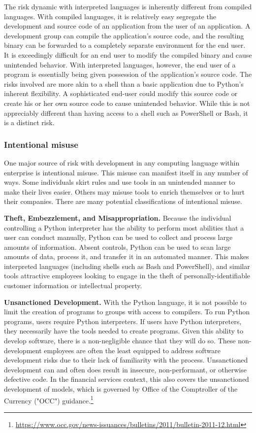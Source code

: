         The risk dynamic with interpreted languages is inherently different from compiled languages. With compiled languages, it is relatively easy segregate the development and source code of an application from the user of an application. A development group can compile the application's source code, and the resulting binary can be forwarded to a completely separate environment for the end user. It is exceedingly difficult for an end user to modify the compiled binary and cause unintended behavior. With interpreted languages, however, the end user of a program is essentially being given possession of the application's source code. The risks involved are more akin to a shell than a basic application due to Python's inherent flexibility. A sophisticated end-user could modify this source code or create his or her own source code to cause unintended behavior. While this is not appreciably different than having access to a shell such as PowerShell or Bash, it is a distinct risk.
 
        \subsubsection{Intentional misuse}
 
            One major source of risk with development in any computing language within enterprise is intentional misuse. This misuse can manifest itself in any number of ways. Some individuals skirt rules and use tools in an unintended manner to make their lives easier. Others may misuse tools to enrich themselves or to hurt their companies. There are many potential classifications of intentional misuse.

            \textbf{Theft, Embezzlement, and Misappropriation.}
            Because the individual controlling a Python interpreter has the ability to perform most abilities that a user can conduct manually, Python can be used to collect and process large amounts of information. Absent controls, Python can be used to scan large amounts of data, process it, and transfer it in an automated manner. This makes interpreted languages (including shells such as Bash and PowerShell), and similar tools attractive employees looking to engage in the theft of personally-identifiable customer information or intellectual property.

            \textbf{Unsanctioned Development.}
            With the Python language, it is not possible to limit the creation of programs to groups with access to compilers. To run Python programs, users require Python interpreters. If users have Python interpreters, they necessarily have the tools needed to create programs. Given this ability to develop software, there is a non-negligible chance that they will do so. These non-development employees are often the least equipped to address software development risks due to their lack of familiarity with the process. Unsanctioned development can and often does result in insecure, non-performant, or otherwise defective code. In the financial services context, this also covers the unsanctioned development of models, which is governed by Office of the Comptroller of the Currency ("OCC") guidance.\footnote{\url{https://www.occ.gov/news-issuances/bulletins/2011/bulletin-2011-12.html}}


